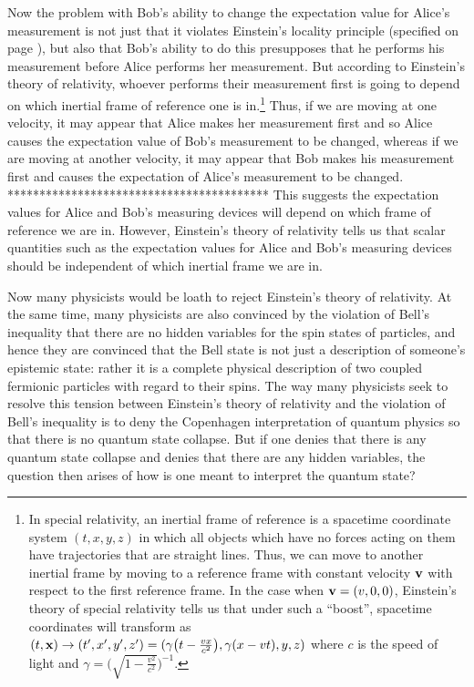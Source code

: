 Now the problem\label{Copenhagenproblem} with Bob's ability to change the expectation value for Alice's measurement is not just that it violates Einstein's locality principle (specified on page \pageref{EinsteinLocalityPrinciple}), but also that Bob's ability to do this presupposes that he performs his measurement before Alice performs her measurement. But according to Einstein's theory of relativity, whoever performs their measurement first is going to depend on which inertial frame of reference one is in.\footnote{In special relativity, an inertial frame of reference is a spacetime coordinate system $(t, x, y, z)$ in which all objects which have no forces acting on them have trajectories that are straight lines. Thus, we can move to another inertial frame by moving to a reference frame with constant velocity $\vb{v}$ with respect to the first reference frame. In the case when $\vb{v}=(v, 0, 0)$, Einstein's theory of special relativity tells us that under such a “boost”, spacetime coordinates will transform as $(t,\vb{x})\rightarrow(t',x',y',z')=(\gamma\big(t - \frac{vx}{c^2}\big),\gamma(x-vt),y,z)$ where $c$ is the speed of light and $\gamma=\Big(\sqrt{1-\frac{v^2}{c^2}}\Big)^{-1}.$ } Thus, if we are moving at one velocity, it may appear that Alice makes her measurement first and so Alice causes the expectation value of Bob's measurement to be changed, whereas if we are moving at another velocity, it may appear that Bob makes his measurement first and causes the expectation of Alice's measurement to be changed. ***************************************** This suggests the expectation values for Alice and Bob's measuring devices will depend on which frame of reference we are in. However, Einstein's theory of relativity tells us that scalar quantities such as the expectation values for Alice and Bob's measuring devices should be independent of which inertial frame we are in. 

Now many physicists would be loath to reject Einstein's theory of relativity. At the same time, many physicists are also convinced by the violation of Bell's inequality that there are no hidden variables for the spin states of particles, and hence they are convinced that the Bell state is not just a description of someone's epistemic state: rather it is a complete physical description of two coupled fermionic particles with regard to their spins. The way many physicists seek to resolve this tension between Einstein's theory of relativity and the violation of Bell's inequality is to deny the Copenhagen interpretation of quantum physics so that there is no quantum state collapse. But if one denies that there is any quantum state collapse and denies that there are any hidden variables, the question then arises of how is one  meant to interpret the quantum state? 



